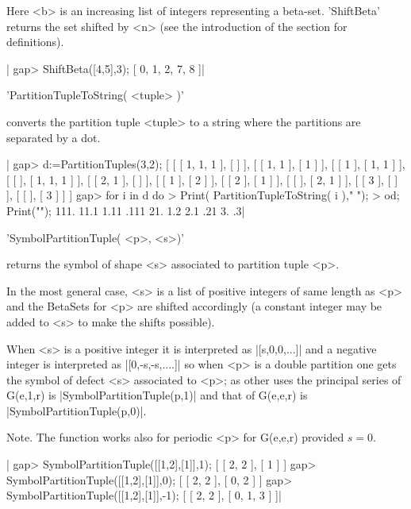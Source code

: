 Here  <b>  is  an  increasing  list  of  integers  representing a beta-set.
'ShiftBeta'  returns the  set shifted  by <n>  (see the introduction of the
section for definitions).

|    gap> ShiftBeta([4,5],3);
    [ 0, 1, 2, 7, 8 ]|

%
%

'PartitionTupleToString( <tuple> )'

converts the partition tuple <tuple>  to a string where the partitions
are separated by a dot.

|    gap> d:=PartitionTuples(3,2);
    [ [ [ 1, 1, 1 ], [  ] ], [ [ 1, 1 ], [ 1 ] ], [ [ 1 ], [ 1, 1 ] ],
      [ [  ], [ 1, 1, 1 ] ], [ [ 2, 1 ], [  ] ], [ [ 1 ], [ 2 ] ],
      [ [ 2 ], [ 1 ] ], [ [  ], [ 2, 1 ] ], [ [ 3 ], [  ] ],
      [ [  ], [ 3 ] ] ]
    gap>  for i in d do
    >      Print( PartitionTupleToString( i ),"   ");
    >  od; Print("\n");
    111.   11.1   1.11   .111   21.   1.2   2.1   .21   3.   .3|

%
%

'SymbolPartitionTuple( <p>, <s>)'

returns the symbol of shape <s> associated to partition tuple <p>.

In the most general case, <s> is a list of positive integers of same length
as <p> and the BetaSets for <p> are shifted accordingly (a constant integer
may be added to <s> to make the shifts possible).

When  <s> is a  positive integer it  is interpreted as  |[s,0,0,...]| and a
negative integer is interpreted as |[0,-s,-s,....]| so when <p> is a double
partition  one gets the  symbol of defect  <s> associated to  <p>; as other
uses  the principal  series of  G(e,1,r) is |SymbolPartitionTuple(p,1)| and
that of G(e,e,r) is |SymbolPartitionTuple(p,0)|.

Note. The function works also for periodic <p> for G(e,e,r) provided $s=0$.

|    gap> SymbolPartitionTuple([[1,2],[1]],1);
    [ [ 2, 2 ], [ 1 ] ]
    gap> SymbolPartitionTuple([[1,2],[1]],0);
    [ [ 2, 2 ], [ 0, 2 ] ]
    gap> SymbolPartitionTuple([[1,2],[1]],-1);
    [ [ 2, 2 ], [ 0, 1, 3 ] ]|

%
%

